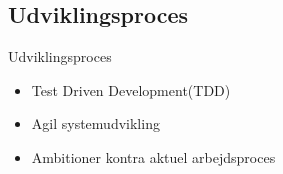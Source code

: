 \subsection{Udviklingsproces}
\begin{frame}{Udviklingsproces}
  \begin{itemize}
    \item Test Driven Development(TDD)
    \item Agil systemudvikling
    \item Ambitioner kontra aktuel arbejdsproces
  \end{itemize}
\end{frame}